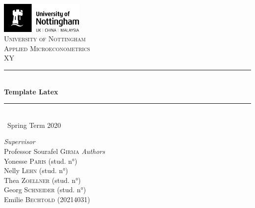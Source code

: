 \documentclass[a4paper,11pt]{scrartcl}
\newcommand{\sectionnumbering}[1]{%
  \setcounter{section}{0}%
   \renewcommand{\thesection}{\csname #1\endcsname{section}}}
\begin{document}
	\begin{titlepage}
		\newcommand{\HRule}{\rule{\linewidth}{0.5mm}}
		
	\vfill\vfill
	\includegraphics[height=1.5cm]{UoN_Logo}\\[1cm] 


	\center			
	\textsc{\LARGE University of Nottingham}\\[1.5cm] 
	\textsc{\Large Applied Microeconometrics}\\[0.5cm] 	
	\textsc{\large XY}\\[0.5cm] 
	
	\HRule\\[0.4cm]
	{\huge\bfseries Template Latex}\\[0.4cm] 
	\HRule\\[0.4cm]
	
	{\large\ Spring Term 2020} 	
	\vfill\vfill\vfill 		
	
\begin{flushleft}
			\large
			\textit{Supervisor}\\
			Professor Sourafel \textsc{Girma} 
			\vfill\vfill 
			\textit{Authors}\\
			Yonesse \textsc{Paris} (stud. n°)\\
			Nelly  \textsc{Lehn} (stud. n°)\\
			Thea  \textsc{Zoellner} (stud. n°)\\
			Georg  \textsc{Schneider} (stud. n°)\\
			Emilie \textsc{Bechtold} (20214031)
		\end{flushleft}
	\vfill 
	
\end{titlepage}


\sectionnumbering{Roman}
\tableofcontents

\newpage

\listoftables
\newpage

\sectionnumbering{arabic}
\end{document}
